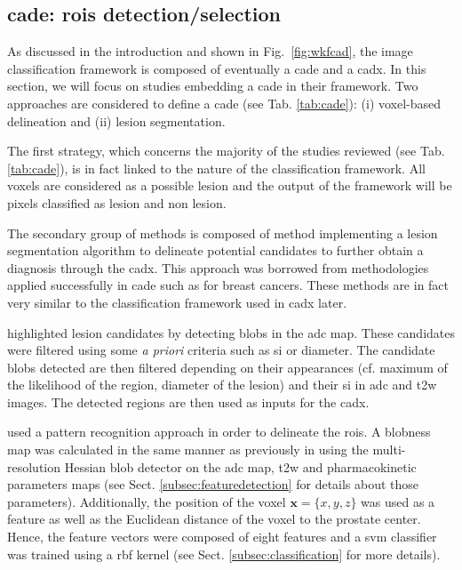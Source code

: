 \subsection{\ac{cade}: \acp{roi} detection/selection}\label{cade}

As discussed in the introduction and shown in Fig.~\ref{fig:wkfcad}, the image classification framework is composed of eventually a \ac{cade} and a \ac{cadx}. In this section, we will focus on studies embedding a \ac{cade} in their framework. Two approaches are considered to define a \ac{cade} (see Tab. \ref{tab:cade}): (i) voxel-based delineation and (ii) lesion segmentation.

The first strategy, which concerns the majority of the studies reviewed (see Tab. \ref{tab:cade}), is in fact linked to the nature of the classification framework. All voxels are considered as a possible lesion and the output of the framework will be pixels classified as lesion and non lesion.

The secondary group of methods is composed of method implementing a lesion segmentation algorithm to delineate potential candidates to further obtain a diagnosis through the \ac{cadx}. This approach was borrowed from methodologies applied successfully in \ac{cade} such as for breast cancers. These methods are in fact very similar to the classification framework used in \ac{cadx} later.

\cite{Vos2012} highlighted lesion candidates by detecting blobs in the \ac{adc} map. These candidates were filtered using some \textit{a priori} criteria such as \ac{si} or diameter. The candidate blobs detected are then filtered depending on their appearances (cf. maximum of the likelihood of the region, diameter of the lesion) and their \ac{si} in \ac{adc} and \ac{t2w} images. The detected regions are then used as inputs for the \ac{cadx}.

\cite{Litjens2011} used a pattern recognition approach in order to delineate the \acp{roi}. A blobness map was calculated in the same manner as previously in \cite{Vos2010} using the multi-resolution Hessian blob detector on the \ac{adc} map, \ac{t2w} and pharmacokinetic parameters maps (see Sect. \ref{subsec:featuredetection} for details about those parameters). Additionally, the position of the voxel $\mathbf{x}=\{x,y,z\}$ was used as a feature as well as the Euclidean distance of the voxel to the prostate center. Hence, the feature vectors were composed of eight features and a \ac{svm} classifier was trained using a \ac{rbf} kernel (see Sect. \ref{subsec:classification} for more details).

